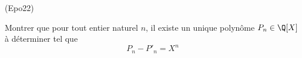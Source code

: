 \begin{tiny}(Epo22)\end{tiny} Montrer que pour tout entier naturel $n$, il existe un unique polynôme $P_n\in \Q[X]$ à déterminer tel que 
\begin{displaymath}
P_n-P'_n = X^n 
\end{displaymath}